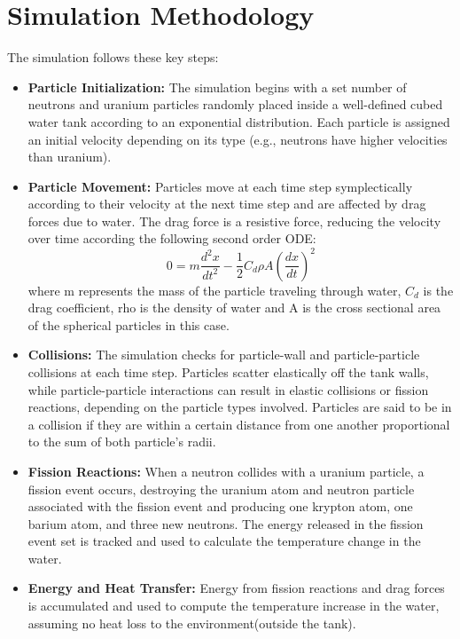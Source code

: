 \documentclass[twocolumn, 11pt]{article}
\begin{document}
\section*{Simulation Methodology}
The simulation follows these key steps:

\begin{itemize}
    \item \textbf{Particle Initialization:} The simulation begins with a set number of neutrons and uranium particles randomly placed inside a well-defined cubed water tank according to an exponential distribution. Each particle is assigned an initial velocity depending on its type (e.g., neutrons have higher velocities than uranium).
    
    \item \textbf{Particle Movement:} Particles move at each time step symplectically according to their velocity at the next time step and are affected by drag forces due to water. The drag force is a resistive force, reducing the velocity over time according the following second order ODE:
        \[
        0 = m\frac{d^{2}x}{dt^{2}} - \frac{1}{2}C_{d}\rho A (\frac{dx}{dt})^2
        \]
    where m represents the mass of the particle traveling through water, \mathrm$C_{d}$ is the drag coefficient, rho is the density of water and A is the cross sectional area of the spherical particles in this case.
    
    \item \textbf{Collisions:} The simulation checks for particle-wall and particle-particle collisions at each time step. Particles scatter elastically off the tank walls, while particle-particle interactions can result in elastic collisions or fission reactions, depending on the particle types involved. Particles are said to be in a collision if they are within a certain distance from one another proportional to the sum of both particle's radii. 
    
    \item \textbf{Fission Reactions:} When a neutron collides with a uranium particle, a fission event occurs, destroying the uranium atom and neutron particle associated with the fission event and producing one krypton atom, one barium atom, and three new neutrons. The energy released in the fission event set is tracked and used to calculate the temperature change in the water.
    
    \item \textbf{Energy and Heat Transfer:} Energy from fission reactions and drag forces is accumulated and used to compute the temperature increase in the water, assuming no heat loss to the environment(outside the tank).
\end{itemize}
\end{document}
